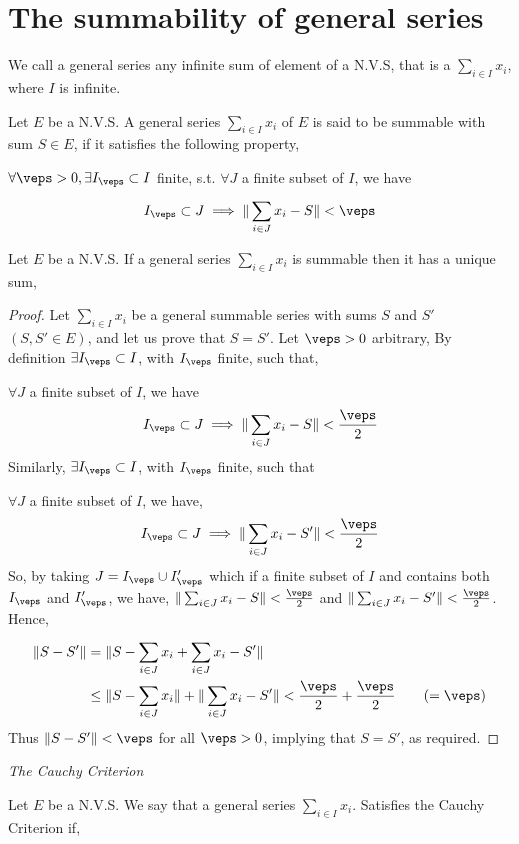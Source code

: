 	\section{The summability of general series}
	We call a general series any infinite sum of element of a N.V.S, that is a 
	$\sum_{i \in I}^{} x_{i} $, where $I $ is infinite.
	\begin{definition}
		Let $E $ be a N.V.S. A general series $\sum_{i \in I}^{} x_{i} $ of $E $ 
		is said to be summable with sum $S \in E $, if it satisfies the following property, 


		$\forall \veps  > 0, \exists I_{\veps } \subset I $ finite, s.t. 
		$\forall  J $ a finite subset of $I $, we have 
		\[
		I_{\veps } \subset J \implies 
		\| \sum_{i \in J}^{} x_{i} - S \|  < \veps 
		\]
	\end{definition}
	\divider	
	Let $E $ be a N.V.S. If a general series $\sum_{i \in I}^{} x_{i} $ is 
	summable then it has a unique sum,
	\begin{proof}
	Let $\sum_{i \in I}^{} x_{i} $ be a general summable series with sums $S $  and $S' $ 
	$(S, S' \in E)  $, and let us prove that $S = S' $. Let $\veps  > 0 $ arbitrary, By definition
	$\exists I_{\veps } \subset I $, with $I_{\veps } $ finite, such that, 

	$\forall J $ a finite subset of $I$, we have 
	\[
	I_{\veps } \subset J \implies 
	\| \sum_{i \in J}^{} x_{i} - S \|  < \frac{\veps }{2} 
	\]
	Similarly, $\exists I_{\veps } \subset I $, with $I_{\veps } $ finite, such that 

	$\forall J $ a finite subset of $I $, we have, 
	\[
	I_{\veps } \subset 
	J \implies 
	\| \sum_{i \in J}^{} x_{i} - S'  \|  < \frac{\veps }{2}
	\]
	So, by taking $J = I_{\veps }\cup I_{\veps }' $ which if a finite subset of $I $ and contains 
	both $I_{\veps } $ and $I_{\veps }' $, we have, 
	$\| \sum_{i \in  J}^{} x_{i} - S \|   <  \frac{\veps }{2}$  and 
	$\| \sum_{i \in J}^{} x_{i} - S' \|  <  \frac{\veps }{2} $. Hence, 
	\begin{align*}
		\| S - S' \|  &= 
		\| S - \sum_{i \in J}^{} x_{i} + \sum_{i \in J}^{} x_{i} - S' \|  \\
			      & \leq 
			      \| S - \sum_{i \in J}^{} x_{i} \|  + 
			      \| \sum_{i \in J}^{} x_{i} - S' \|  < 
			      \frac{\veps }{2} + \frac{\veps }{2} \quad 
			      \quad (= \veps ) 
	\end{align*} 
	Thus $\| S - S' \|  <  \veps  $ for all $ \veps  > 0 $, implying that  
	$S = S' $, as required.
	\end{proof}
	\divider
	\begin{center}
		\it The Cauchy Criterion \normalfont
	\end{center}
	Let $E $ be a N.V.S. We say that a general series $\sum_{i \in I}^{} x_{i} $. Satisfies 
	the Cauchy Criterion if,  


